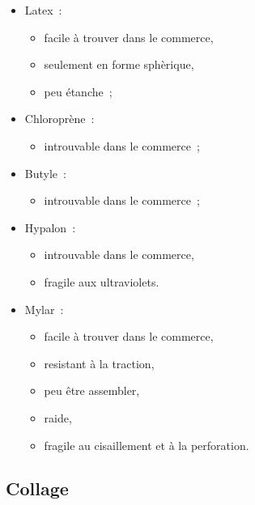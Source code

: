 \documentclass{beamer}
\begin{document}
\begin{frame}
  \begin{multicols}{2}
    \begin{itemize}
      \item Latex~:
      \begin{itemize}
        \item facile à trouver dans le commerce,
        \item seulement en forme sphèrique,
        \item peu étanche~;
      \end{itemize}
      \item Chloroprène~:
      \begin{itemize}
        \item introuvable dans le commerce~;
      \end{itemize}
      \item Butyle~:
      \begin{itemize}
        \item introuvable dans le commerce~;
      \end{itemize}
      \item Hypalon~:
      \begin{itemize}
        \item introuvable dans le commerce,
        \item fragile aux ultraviolets.
      \end{itemize}
    \end{itemize}
    \newpage
    \begin{itemize}
      \item Mylar~:
      \begin{itemize}
        \item facile à trouver dans le commerce,
        \item resistant à la traction,
        \item peu être assembler,
        \item raide,
        \item fragile au cisaillement et à la perforation.
      \end{itemize}
    \end{itemize}
  \end{multicols}
\end{frame}

\subsection{Collage}
\end{document}
